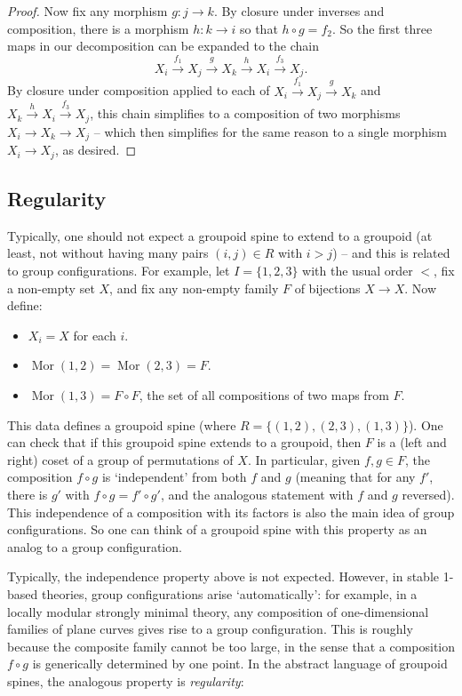 \documentclass{amsart}
\theoremstyle{definition}
\begin{document}
\begin{proof}
    Now fix any morphism $g:j\rightarrow k$. By closure under inverses and composition, there is a morphism $h:k\rightarrow i$ so that $h\circ g=f_2$. So the first three maps in our decomposition can be expanded to the chain $$X_i\xrightarrow{f_1}X_j\xrightarrow gX_k\xrightarrow hX_i\xrightarrow{f_3}X_j.$$ By closure under composition applied to each of $X_i\xrightarrow{f_1}X_j\xrightarrow gX_k$ and $X_k\xrightarrow hX_i\xrightarrow{f_3}X_j$, this chain simplifies to a composition of two morphisms $X_i\rightarrow X_k\rightarrow X_j$ -- which then simplifies for the same reason to a single morphism $X_i\rightarrow X_j$, as desired. 
    \end{proof}

\subsection{Regularity}

Typically, one should not expect a groupoid spine to extend to a groupoid (at least, not without having many pairs $(i,j)\in R$ with $i>j$) -- and this is related to group configurations. For example, let $I=\{1,2,3\}$ with the usual order $<$, fix a non-empty set $X$, and fix any non-empty family $F$ of bijections $X\rightarrow X$. Now define:
\begin{itemize}
    \item $X_i=X$ for each $i$.
    \item $\operatorname{Mor}(1,2)=\operatorname{Mor}(2,3)=F$.
    \item $\operatorname{Mor}(1,3)=F\circ F$, the set of all compositions of two maps from $F$.
\end{itemize}
This data defines a groupoid spine (where $R=\{(1,2),(2,3),(1,3)\}$). One can check that if this groupoid spine extends to a groupoid, then $F$ is a (left and right) coset of a group of permutations of $X$. In particular, given $f,g\in F$, the composition $f\circ g$ is `independent' from both $f$ and $g$  (meaning that for any $f'$, there is $g'$ with $f\circ g=f'\circ g'$, and the analogous statement with $f$ and $g$ reversed). This independence of a composition with its factors is also the main idea of group configurations. So one can think of a groupoid spine with this property as an analog to a group configuration.

Typically, the independence property above is not expected. However, in stable 1-based theories, group configurations arise `automatically': for example, in a locally modular strongly minimal theory, any composition of one-dimensional families of plane curves gives rise to a group configuration. This is roughly because the composite family cannot be too large, in the sense that a composition $f\circ g$ is generically determined by one point. In the abstract language of groupoid spines, the analogous property is \textit{regularity}:
\end{document}
